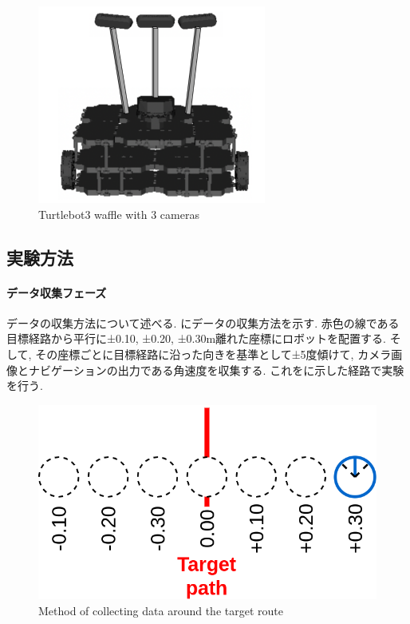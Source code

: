 \begin{figure}[h]
  \centering
  \includegraphics[keepaspectratio, scale=0.55]{images/turtlebot3.png}
  \caption{Turtlebot3 waffle with 3 cameras}
  \label{Fig:turtlebot3}
  \end{figure}

\newpage
\subsection{実験方法}
\paragraph{データ収集フェーズ}
データの収集方法について述べる. にデータの収集方法を示す. 赤色の線である目標経路から平行に±0.10, ±0.20, ±0.30m離れた座標にロボットを配置する. そして, その座標ごとに目標経路に沿った向きを基準として±5度傾けて, カメラ画像とナビゲーションの出力である角速度を収集する. これをに示した経路で実験を行う. 
\begin{figure}[h]
  \centering
  \includegraphics[keepaspectratio, scale=0.25]{images/old-method.png}
  \caption{Method of collecting data around the target route}
  \label{Fig:old-method}
  \end{figure}

